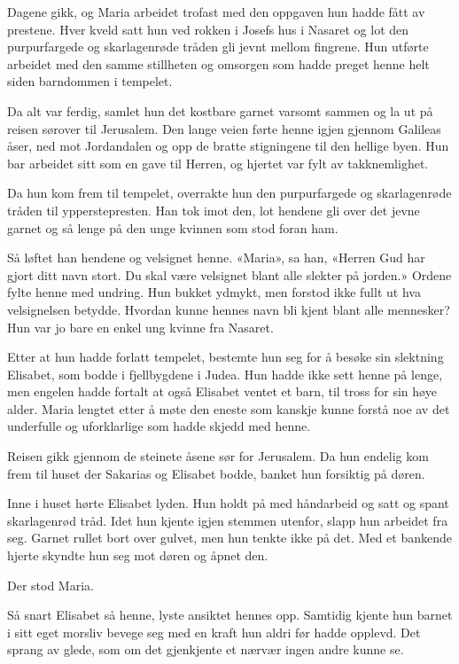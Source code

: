 Dagene gikk, og Maria arbeidet trofast med den oppgaven
hun hadde fått av prestene. Hver kveld satt hun ved rokken i
Josefs hus i Nasaret og lot den purpurfargede og
skarlagenrøde tråden gli jevnt mellom fingrene.
Hun utførte arbeidet med den samme stillheten og
omsorgen som hadde preget henne helt siden barndommen i tempelet.

Da alt var ferdig, samlet hun det kostbare garnet varsomt
sammen og la ut på reisen sørover til Jerusalem.
Den lange veien førte henne igjen gjennom Galileas åser, ned
mot Jordandalen og opp de bratte stigningene til den hellige byen.
Hun bar arbeidet sitt som en gave til Herren,
og hjertet var fylt av takknemlighet.

Da hun kom frem til tempelet, overrakte
hun den purpurfargede og skarlagenrøde tråden til ypperstepresten.
Han tok imot den, lot hendene gli over det jevne garnet og
så lenge på den unge kvinnen som stod foran ham.

Så løftet han hendene og velsignet henne.
«Maria», sa han, «Herren Gud har gjort ditt navn stort.
Du skal være velsignet blant alle slekter på jorden.»
Ordene fylte henne med undring. Hun bukket ydmykt,
men forstod ikke fullt ut hva velsignelsen betydde.
Hvordan kunne hennes navn bli kjent blant alle mennesker?
Hun var jo bare en enkel ung kvinne fra Nasaret.

Etter at hun hadde forlatt tempelet, bestemte hun seg for
å besøke sin slektning Elisabet, som bodde i fjellbygdene i Judea.
Hun hadde ikke sett henne på lenge, men engelen hadde fortalt at
også Elisabet ventet et barn, til tross for sin høye alder.
Maria lengtet etter å møte den eneste som kanskje
kunne forstå noe av det underfulle og uforklarlige som hadde skjedd med henne.

Reisen gikk gjennom de steinete åsene sør for Jerusalem.
Da hun endelig kom frem til huset der Sakarias og
Elisabet bodde, banket hun forsiktig på døren.

Inne i huset hørte Elisabet lyden. Hun holdt på med
håndarbeid og satt og spant skarlagenrød tråd.
Idet hun kjente igjen stemmen utenfor,
slapp hun arbeidet fra seg. Garnet rullet bort over gulvet,
men hun tenkte ikke på det. Med et bankende hjerte
skyndte hun seg mot døren og åpnet den.

Der stod Maria.

Så snart Elisabet så henne, lyste ansiktet hennes opp.
Samtidig kjente hun barnet i sitt eget morsliv bevege seg
med en kraft hun aldri før hadde opplevd.
Det sprang av glede, som om det gjenkjente et nærvær ingen andre kunne se.

